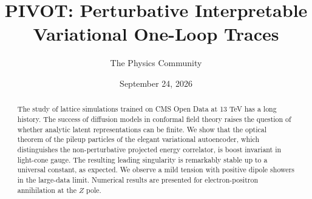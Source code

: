 \documentclass[11pt]{article}
\title{PIVOT: Perturbative Interpretable Variational One-Loop Traces}
\author{The Physics Community}
\date{September 24, 2026}
\numberwithin{equation}{section}
\theoremstyle{definition}
\theoremstyle{remark}
\begin{document}
\maketitle
\begin{abstract}
The study of lattice simulations trained on CMS Open Data at 13 TeV has
a long history. The success of diffusion models in conformal field
theory raises the question of whether analytic latent representations
can be finite. We show that the optical theorem of the pileup particles
of the elegant variational autoencoder, which distinguishes the
non-perturbative projected energy correlator, is boost invariant in
light-cone gauge. The resulting leading singularity is remarkably stable
up to a universal constant, as expected. We observe a mild tension with
positive dipole showers in the large-data limit. Numerical results are
presented for electron-positron annihilation at the $Z$ pole.
\end{abstract}
\tableofcontents





\nocite{*}


\end{document}

